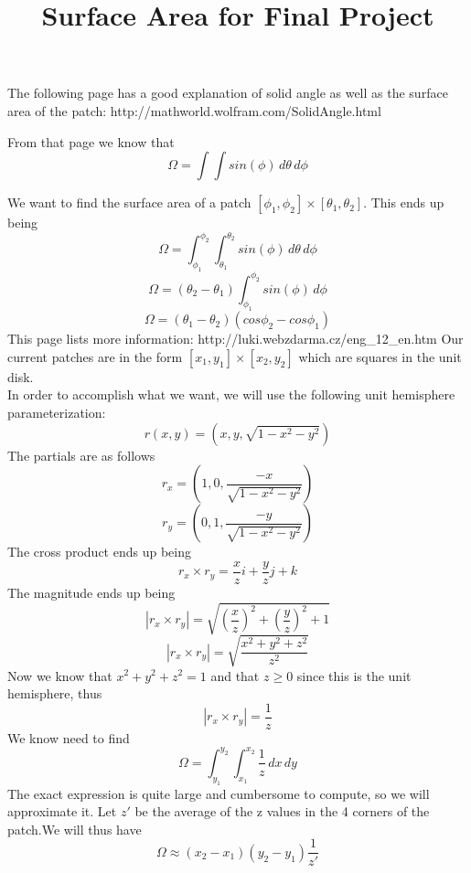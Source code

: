 \documentclass[11pt,psfig]{article}
\begin{document}
\setlength{\parskip}{1.2ex plus0.3ex minus 0.3ex}

\title{Surface Area for Final Project}
\maketitle
The following page has a good explanation of solid angle as well as the surface area of the patch:
http://mathworld.wolfram.com/SolidAngle.html

From that page we know that
\[
\Omega = \int{ \int{ sin(\phi) \,d\theta \,d\phi }}
\]

We want to find the surface area of a patch $[\phi_1,\phi_2] \times [\theta_1,\theta_2]$. This ends up being
\[
\Omega = \int_{\phi_1}^{\phi_2}{ \int_{\theta_1}^{\theta_2}{ sin(\phi) \,d\theta \,d\phi }}
\]
\[
\Omega = (\theta_2 - \theta_1)\int_{\phi_1}^{\phi_2}{  sin(\phi) \,d\phi }
\]
\[
\Omega = (\theta_1 - \theta_2)(cos\phi_2 - cos\phi_1)
\]
This page lists more information:
http://luki.webzdarma.cz/eng\_12\_en.htm
\newpage
Our current patches are in the form $[x_1,y_1] \times [x_2,y_2]$ which are squares in the unit disk. 
\\
In order to accomplish what we want, we will use the following unit hemisphere parameterization:
\[
r(x,y) = (x, y, \sqrt{1-x^2-y^2})
\]
The partials are as follows
\[
r_x = (1,0,\frac{-x}{\sqrt{1-x^2-y^2}})
\]
\[
r_y = (0,1,\frac{-y}{\sqrt{1-x^2-y^2}})
\]
The cross product ends up being
\[
r_x \times r_y = \frac{x}{z}i + \frac{y}{z}j + k
\]
The magnitude ends up being
\[
|r_x \times r_y| = \sqrt{ (\frac{x}{z})^2 + (\frac{y}{z})^2 + 1 }
\]
\[
|r_x \times r_y| = \sqrt{ \frac{x^2+y^2+z^2}{z^2} }
\]
Now we know that $x^2 + y^2 + z^2 = 1$ and that $z \geq 0$ since this is the unit hemisphere, thus
\[
|r_x \times r_y| = \frac{1}{z}
\]
We know need to find
\[
\Omega = \int_{y_1}^{y_2}{ \int_{x_1}^{x_2}{\frac{1}{z} \,dx \,dy} }
\]
The exact expression is quite large and cumbersome to compute, so we will approximate it. Let $z'$ be the average of the z values in the 4 corners of the patch.We will thus have
\[
\Omega \approx (x_2-x_1)(y_2-y_1)\frac{1}{z'}
\]
\end{document}
